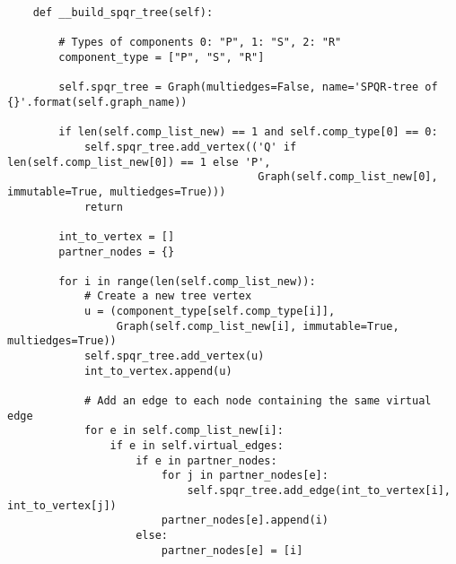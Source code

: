 \begin{verbatim}
	def __build_spqr_tree(self):

		# Types of components 0: "P", 1: "S", 2: "R"
		component_type = ["P", "S", "R"]

		self.spqr_tree = Graph(multiedges=False, name='SPQR-tree of {}'.format(self.graph_name))

		if len(self.comp_list_new) == 1 and self.comp_type[0] == 0:
			self.spqr_tree.add_vertex(('Q' if len(self.comp_list_new[0]) == 1 else 'P',
									   Graph(self.comp_list_new[0], immutable=True, multiedges=True)))
			return

		int_to_vertex = []
		partner_nodes = {}

		for i in range(len(self.comp_list_new)):
			# Create a new tree vertex
			u = (component_type[self.comp_type[i]],
				 Graph(self.comp_list_new[i], immutable=True, multiedges=True))
			self.spqr_tree.add_vertex(u)
			int_to_vertex.append(u)

			# Add an edge to each node containing the same virtual edge
			for e in self.comp_list_new[i]:
				if e in self.virtual_edges:
					if e in partner_nodes:
						for j in partner_nodes[e]:
							self.spqr_tree.add_edge(int_to_vertex[i], int_to_vertex[j])
						partner_nodes[e].append(i)
					else:
						partner_nodes[e] = [i]

\end{verbatim}
